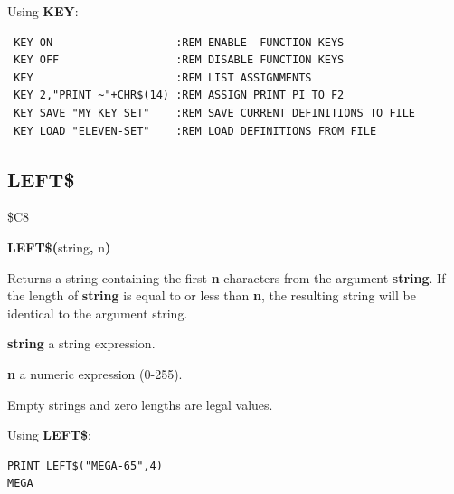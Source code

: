 \begin{description}[leftmargin=2cm,style=nextline]
\item [Examples:] Using {\bf KEY}:
\begin{tcolorbox}[colback=black,coltext=white]
\verbatimfont{\codefont}
\begin{verbatim}
 KEY ON                   :REM ENABLE  FUNCTION KEYS
 KEY OFF                  :REM DISABLE FUNCTION KEYS
 KEY                      :REM LIST ASSIGNMENTS
 KEY 2,"PRINT ~"+CHR$(14) :REM ASSIGN PRINT PI TO F2
 KEY SAVE "MY KEY SET"    :REM SAVE CURRENT DEFINITIONS TO FILE
 KEY LOAD "ELEVEN-SET"    :REM LOAD DEFINITIONS FROM FILE
\end{verbatim}
\end{tcolorbox}
\end{description}


\newpage
\subsection{LEFT\$}
\begin{description}[leftmargin=2cm,style=nextline]
\item [Token:] \$C8
\item [Format:] {\bf LEFT\$(}string{\bf,} n{\bf)}
\item [Usage:] Returns a string
               containing the first {\bf n} characters from the
               argument {\bf string}.
               If the length of {\bf string} is equal to or less than {\bf n},
               the resulting string will be identical to the argument string.

               {\bf string} a string expression.

               {\bf n} a numeric expression (0-255).

\item [Remarks:] Empty strings and zero lengths are legal values.

\item [Example:] Using {\bf LEFT\$}:
\begin{tcolorbox}[colback=black,coltext=white]
\verbatimfont{\codefont}
\begin{verbatim}
PRINT LEFT$("MEGA-65",4)
MEGA
\end{verbatim}
\end{tcolorbox}
\end{description}


\newpage
